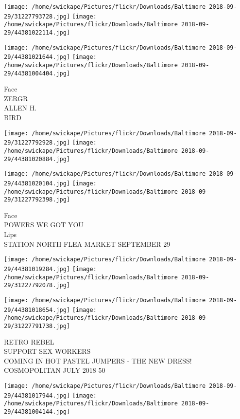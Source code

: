 \documentclass[10pt,letterpaper]{article}
\begin{document}
\texttt{[image: /home/swickape/Pictures/flickr/Downloads/Baltimore 2018-09-29/31227793728.jpg]}
\texttt{[image: /home/swickape/Pictures/flickr/Downloads/Baltimore 2018-09-29/44381022114.jpg]}

\texttt{[image: /home/swickape/Pictures/flickr/Downloads/Baltimore 2018-09-29/44381021644.jpg]}
\texttt{[image: /home/swickape/Pictures/flickr/Downloads/Baltimore 2018-09-29/44381004404.jpg]}

Face\\
ZERGR\\
ALLEN H.\\
BIRD\\
\pagebreak

\texttt{[image: /home/swickape/Pictures/flickr/Downloads/Baltimore 2018-09-29/31227792928.jpg]}
\texttt{[image: /home/swickape/Pictures/flickr/Downloads/Baltimore 2018-09-29/44381020884.jpg]}

\texttt{[image: /home/swickape/Pictures/flickr/Downloads/Baltimore 2018-09-29/44381020104.jpg]}
\texttt{[image: /home/swickape/Pictures/flickr/Downloads/Baltimore 2018-09-29/31227792398.jpg]}

Face\\
POWERS WE GOT YOU\\
Lips\\
STATION NORTH FLEA MARKET SEPTEMBER 29\\
\pagebreak

\texttt{[image: /home/swickape/Pictures/flickr/Downloads/Baltimore 2018-09-29/44381019284.jpg]}
\texttt{[image: /home/swickape/Pictures/flickr/Downloads/Baltimore 2018-09-29/31227792078.jpg]}

\texttt{[image: /home/swickape/Pictures/flickr/Downloads/Baltimore 2018-09-29/44381018654.jpg]}
\texttt{[image: /home/swickape/Pictures/flickr/Downloads/Baltimore 2018-09-29/31227791738.jpg]}

RETRO REBEL\\
SUPPORT SEX WORKERS\\
COMING IN HOT PASTEL JUMPERS {-} THE NEW DRESS!\\
COSMOPOLITAN JULY 2018 50\\
\pagebreak

\texttt{[image: /home/swickape/Pictures/flickr/Downloads/Baltimore 2018-09-29/44381017944.jpg]}
\texttt{[image: /home/swickape/Pictures/flickr/Downloads/Baltimore 2018-09-29/44381004144.jpg]}
\end{document}
